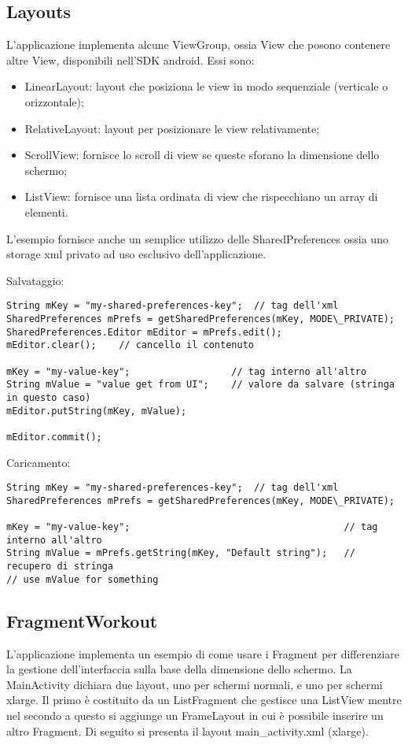 \subsection{Layouts}
L'applicazione implementa alcune ViewGroup, ossia View che posono contenere altre View, disponibili nell'SDK android. Essi sono:
\begin{itemize}
	\item LinearLayout: layout che posiziona le view in modo sequenziale (verticale o orizzontale);
	\item RelativeLayout: layout per posizionare le view relativamente;
	\item ScrollView: fornisce lo scroll di view se queste sforano la dimensione dello schermo;
	\item ListView: fornisce una lista ordinata di view che rispecchiano un array di elementi.
\end{itemize}

L'esempio fornisce anche un semplice utilizzo delle SharedPreferences ossia uno storage xml privato ad uso esclusivo dell'applicazione.

Salvataggio:
\begin{lstlisting}
String mKey = "my-shared-preferences-key";	// tag dell'xml
SharedPreferences mPrefs = getSharedPreferences(mKey, MODE\_PRIVATE);
SharedPreferences.Editor mEditor = mPrefs.edit();
mEditor.clear();	// cancello il contenuto

mKey = "my-value-key";					// tag interno all'altro
String mValue = "value get from UI";	// valore da salvare (stringa in questo caso)
mEditor.putString(mKey, mValue);

mEditor.commit();
\end{lstlisting}

Caricamento:
\begin{lstlisting}
String mKey = "my-shared-preferences-key";	// tag dell'xml
SharedPreferences mPrefs = getSharedPreferences(mKey, MODE\_PRIVATE);

mKey = "my-value-key";										// tag interno all'altro
String mValue = mPrefs.getString(mKey, "Default string");	// recupero di stringa
// use mValue for something
\end{lstlisting}


\subsection{FragmentWorkout}
L'applicazione implementa un esempio di come usare i Fragment per differenziare la gestione dell'interfaccia sulla base della dimensione dello schermo.
La MainActivity dichiara due layout, uno per schermi normali, e uno per schermi xlarge. Il primo è costituito da un ListFragment che gestisce una ListView mentre nel secondo a questo si aggiunge un FrameLayout in cui è possibile inserire un altro Fragment. Di seguito si presenta il layout main\_activity.xml (xlarge).

